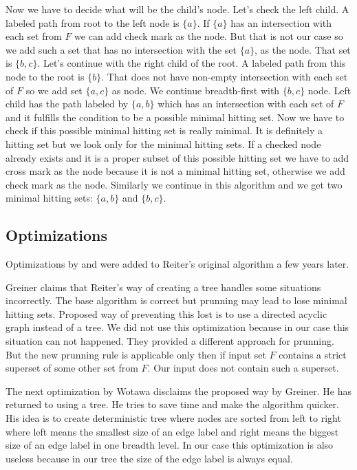 \documentclass[12pt,a4paper]{article}
\begin{document}
Now we have to decide what will be the child's node. Let's check the left child. A labeled path from root to the left node is $\{a\}$. If $\{a\}$ has an intersection with each set from $F$ we can add check mark as the node. But that is not our case so we add such a set that has no intersection with the set $\{ a \}$, as the node. That set is $\{b,c\}$. Let's continue with the right child of the root. A labeled path from this node to the root is $\{b\}$. That does not have non-empty intersection with each set of $F$ so we add set $\{ a,c \}$ as node. We continue breadth-first with $\{b,c\}$ node. Left child has the path labeled by $\{a,b\}$ which has an intersection with each set of $F$ and it fulfills the condition to be a possible minimal hitting set. Now we have to check if this possible minimal hitting set is really minimal. It is definitely a hitting set but we look only for the minimal hitting sets. If a checked node already exists and it is a proper subset of this possible hitting set we have to add cross mark as the node because it is not a minimal hitting set, otherwise we add check mark as the node. Similarly we continue in this algorithm and we get two minimal hitting sets: $\{a,b\}$ and $\{b,c\}$.

\subsection{Optimizations}
Optimizations by \cite{greinerReitersCorrection} and \cite{wotawaReitersVariant} were added to Reiter's original algorithm a few years later. 

Greiner claims that Reiter's way of creating a tree handles some situations incorrectly. The base algorithm is correct but prunning may lead to lose minimal hitting sets. Proposed way of preventing this lost is to use a directed acyclic graph instead of a tree. We did not use this optimization because in our case this situation can not happened. They provided a different approach for prunning. But the new prunning rule is applicable only then if input set $F$ contains a strict superset of some other set from $F$. Our input does not contain such a superset.

The next optimization by Wotawa disclaims the proposed way by Greiner. He has returned to using a tree. He tries to save time and make the algorithm quicker. His idea is to create deterministic tree where nodes are sorted from left to right where left means the smallest size of an edge label and right means the biggest size of an edge label in one breadth level. In our case this optimization is also useless because in our tree the size of the edge label is always equal.
\end{document}
